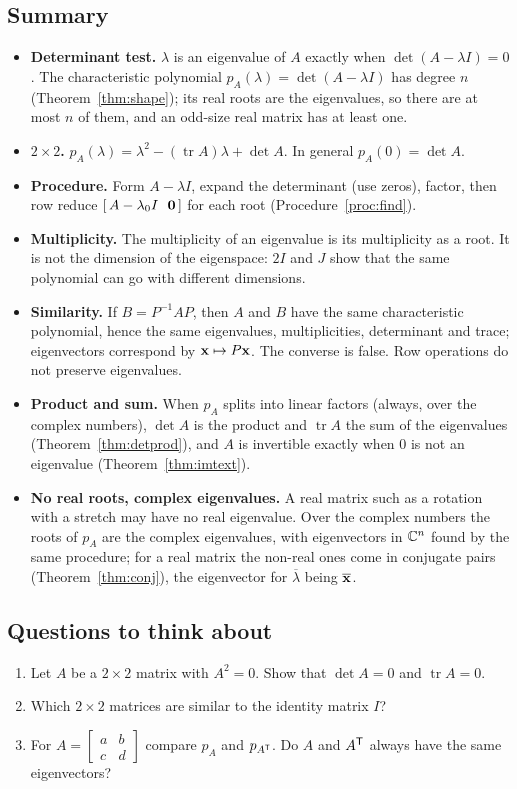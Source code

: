 \documentclass[11pt]{article}
\begin{document}
\subsection*{Summary}
\begin{itemize}
  \item \textbf{Determinant test.} $\lambda$ is an eigenvalue of $A$ exactly when $\det(A-\lambda I)=0$. The characteristic polynomial $p_A(\lambda)=\det(A-\lambda I)$ has degree $n$ (Theorem~\ref{thm:shape}); its real roots are the eigenvalues, so there are at most $n$ of them, and an odd-size real matrix has at least one.
  \item \textbf{$2\times2$.} $p_A(\lambda)=\lambda^2-(\operatorname{tr}A)\lambda+\det A$. In general $p_A(0)=\det A$.
  \item \textbf{Procedure.} Form $A-\lambda I$, expand the determinant (use zeros), factor, then row reduce $[\,A-\lambda_0I\ \ \mathbf{0}\,]$ for each root (Procedure~\ref{proc:find}).
  \item \textbf{Multiplicity.} The multiplicity of an eigenvalue is its multiplicity as a root. It is not the dimension of the eigenspace: $2I$ and $J$ show that the same polynomial can go with different dimensions.
  \item \textbf{Similarity.} If $B=P^{-1}AP$, then $A$ and $B$ have the same characteristic polynomial, hence the same eigenvalues, multiplicities, determinant and trace; eigenvectors correspond by $\mathbf{x}\mapsto P\mathbf{x}$. The converse is false. Row operations do not preserve eigenvalues.
  \item \textbf{Product and sum.} When $p_A$ splits into linear factors (always, over the complex numbers), $\det A$ is the product and $\operatorname{tr}A$ the sum of the eigenvalues (Theorem~\ref{thm:detprod}), and $A$ is invertible exactly when $0$ is not an eigenvalue (Theorem~\ref{thm:imtext}).
  \item \textbf{No real roots, complex eigenvalues.} A real matrix such as a rotation with a stretch may have no real eigenvalue. Over the complex numbers the roots of $p_A$ are the complex eigenvalues, with eigenvectors in $\mathbb{C}^n$ found by the same procedure; for a real matrix the non-real ones come in conjugate pairs (Theorem~\ref{thm:conj}), the eigenvector for $\overline{\lambda}$ being $\overline{\mathbf{x}}$.
\end{itemize}

\subsection*{Questions to think about}
\begin{enumerate}
  \item Let $A$ be a $2\times2$ matrix with $A^2=0$. Show that $\det A=0$ and $\operatorname{tr}A=0$.
  \item Which $2\times2$ matrices are similar to the identity matrix $I$?
  \item For $A=\begin{bmatrix}a&b\\c&d\end{bmatrix}$ compare $p_A$ and $p_{A^{\mathsf T}}$. Do $A$ and $A^{\mathsf T}$ always have the same eigenvectors?
\end{enumerate}
\end{document}
